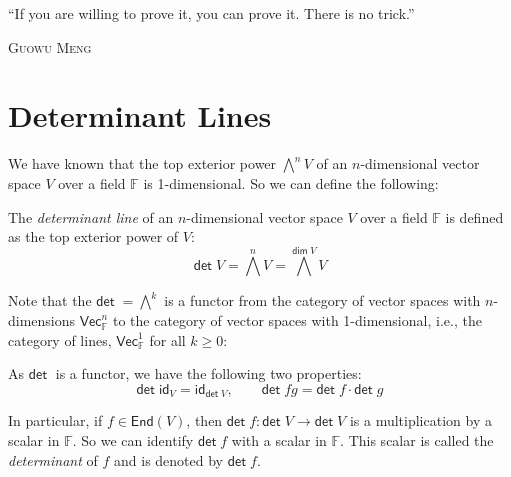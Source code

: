 \documentclass[
	11pt, %
	fleqn, %
	a4paper, %
]{LegrandOrangeBook}
\newcommand{\End}[1]{\mathsf{End}(#1)} %
\newcommand{\F}{\mathbb{F}} %
\newcommand{\id}{\mathsf{id}} %
\newcommand{\Vect}{\boldsymbol{\mathsf{Vec}}} %
\renewcommand{\dim}{\mathsf{dim\;}} %
\renewcommand{\det}{\mathsf{det\;}} %
\let\originalepigraph\epigraph
\renewcommand\epigraph[2]{\originalepigraph{#1}{\textsc{#2}}}
\begin{document}
\epigraph{``If you are willing to prove it, you can prove it. There is no trick.''}{Guowu Meng}

\section{Determinant Lines}

We have known that the top exterior power ${\bigwedge}^n V$ of an $n$-dimensional vector space $V$ over a field $\F$ is 1-dimensional. So we can define the following:

\begin{definition}
    The \emph{determinant line} of an $n$-dimensional vector space $V$ over a field $\F$ is defined as the top exterior power of $V$:
    \[
        \det{V} = {\bigwedge}^n V = {\bigwedge}^{\dim{V}} V
    \]
\end{definition}

Note that the $\det = {\bigwedge}^k$ is a functor from the category of vector spaces with $n$-dimensions $\Vect_{\F}^n$ to the category of vector spaces with 1-dimensional, i.e., the category of lines, $\Vect_{\F}^1$ for all $k \geq 0$:
\begin{center}
\end{center}

As $\det$ is a functor, we have the following two properties:
\[
    \det \id_V = \id_{\det V}, \qquad \det fg = \det f \cdot \det g
\]

In particular, if $f \in \End{V}$, then $\det f : \det V \to \det V$ is a multiplication by a scalar in $\F$. So we can identify $\det f$ with a scalar in $\F$. This scalar is called the \emph{determinant} of $f$ and is denoted by $\det f$.
\end{document}
